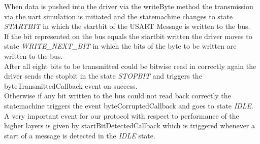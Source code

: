 When data is pushed into the driver via the writeByte method the transmission via the uart simulation is initiated and the statemachine changes to state \textit{STARTBIT} in which the startbit of the USART Message is written to the bus.\\

If the bit represented on the bus equals the startbit written the driver moves to state \textit{WRITE\_NEXT\_BIT} in which the bits of the byte to be written are written to the bus.\\

After all eight bits to be transmitted could be bitwise read in correctly again the driver sends the stopbit in the state \textit{STOPBIT} and triggers the byteTransmittedCallback event on success.\\

Otherwise if any bit written to the bus could not read back correctly the statemachine triggers the event byteCorruptedCallback and goes to state \textit{IDLE}.\\

A very important event for our protocol with respect to performance of the higher layers is given by startBitDetectedCallback which is triggered whenever a start of a message is detected in the \textit{IDLE} state.\\